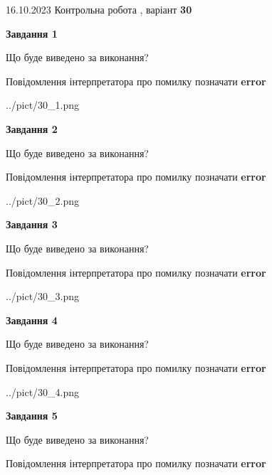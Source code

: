 \documentclass[12pt, ukrainian]{article}
\begin{document}
{\Large{16.10.2023 Контрольна робота , варіант  \No \textbf { 30 }\par}}
{
\begin {large}
{\begin {center}\textbf{Завдання 1}\end {center}}\par
Що буде виведено за виконання? \par
Повідомлення інтерпретатора про помилку позначати \textbf{error}

\begin{center}
	{../pict/30_1.png}
\end{center}
\newpage

{\begin {center}\textbf{Завдання 2}\end {center}}\par
Що буде виведено за виконання? \par
Повідомлення інтерпретатора про помилку позначати \textbf{error}

\begin{center}
	{../pict/30_2.png}
\end{center}
\newpage

{\begin {center}\textbf{Завдання 3}\end {center}}\par
Що буде виведено за виконання? \par
Повідомлення інтерпретатора про помилку позначати \textbf{error}

\begin{center}
	{../pict/30_3.png}
\end{center}
\newpage

{\begin {center}\textbf{Завдання 4}\end {center}}\par
Що буде виведено за виконання? \par
Повідомлення інтерпретатора про помилку позначати \textbf{error}

\begin{center}
	{../pict/30_4.png}
\end{center}
\newpage

{\begin {center}\textbf{Завдання 5}\end {center}}\par
Що буде виведено за виконання? \par
Повідомлення інтерпретатора про помилку позначати \textbf{error}


\end{large}}
\end{document}
